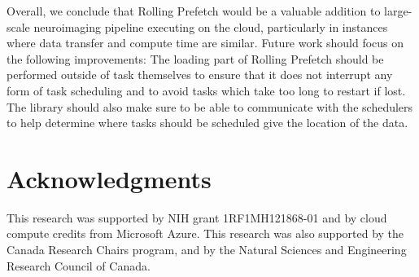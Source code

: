 \documentclass[conference]{IEEEtran}
\begin{document}
Overall, we conclude that Rolling Prefetch would be a valuable addition to large-scale neuroimaging pipeline executing
on the cloud, particularly in instances where data transfer and compute time are similar. 
Future work should focus on the following improvements: The loading part of Rolling Prefetch should be performed outside of task themselves to ensure that it does not interrupt any form of task scheduling and to avoid tasks which take too long to restart if lost. 
The library should also make sure to be able to communicate with the schedulers to help determine where tasks
should be scheduled give the location of the data.

\section{Acknowledgments} 

This research was supported by NIH grant 1RF1MH121868-01 and by cloud compute credits from Microsoft Azure. This research was also supported by the Canada Research Chairs program, and by the Natural Sciences and Engineering Research Council of Canada.




\end{document}
